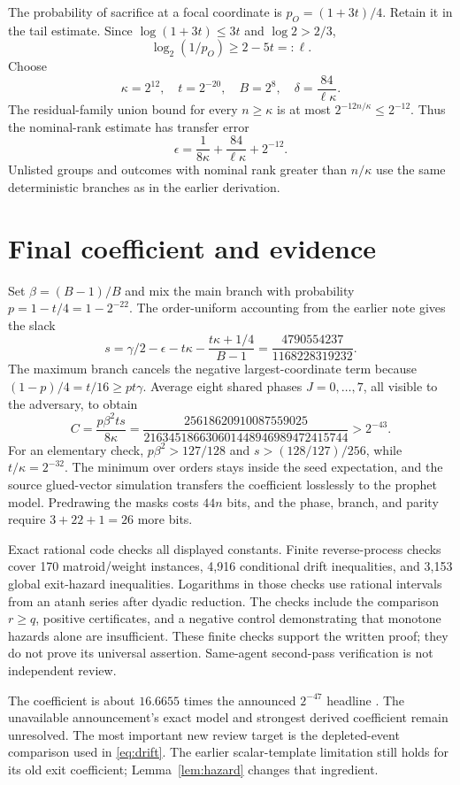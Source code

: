 \documentclass[11pt]{article}
\begin{document}
The probability of sacrifice at a focal coordinate is
$p_O=(1+3t)/4$. Retain it in the tail estimate. Since
$\log(1+3t)\le3t$ and $\log2>2/3$,
\[
 \log_2(1/p_O)\ge2-5t=:\ell.
\]
Choose
\[
 \kappa=2^{12},\quad t=2^{-20},\quad B=2^8,\quad
 \delta=\frac{84}{\ell\kappa}.
\]
The residual-family union bound for every $n\ge\kappa$ is at most
$2^{-12n/\kappa}\le2^{-12}$. Thus the nominal-rank estimate has
transfer error
\[
 \epsilon=\frac1{8\kappa}+\frac{84}{\ell\kappa}+2^{-12}.
\]
Unlisted groups and outcomes with nominal rank greater than $n/\kappa$
use the same deterministic branches as in the earlier derivation.

\section{Final coefficient and evidence}

Set $\beta=(B-1)/B$ and mix the main branch with probability
$p=1-t/4=1-2^{-22}$. The order-uniform accounting from the earlier note
gives the slack
\[
 s=\gamma/2-\epsilon-t\kappa-\frac{t\kappa+1/4}{B-1}
 =\frac{4790554237}{1168228319232}.
\]
The maximum branch cancels the negative largest-coordinate term because
$(1-p)/4=t/16\ge pt\gamma$. Average eight shared phases
$J=0,\ldots,7$, all visible to the adversary, to obtain
\[
 C=\frac{p\beta^2ts}{8\kappa}
 =\frac{25618620910087559025}{216345186630601448946989472415744}
 >2^{-43}.
\]
For an elementary check, $p\beta^2>127/128$ and
$s>(128/127)/256$, while $t/\kappa=2^{-32}$.
The minimum over orders stays inside the seed expectation, and the
source glued-vector simulation transfers the coefficient losslessly
to the prophet model. Predrawing the masks costs $44n$ bits, and the
phase, branch, and parity require $3+22+1=26$ more bits.

Exact rational code checks all displayed constants. Finite reverse-process
checks cover 170 matroid/weight instances, 4,916 conditional drift
inequalities, and 3,153 global exit-hazard inequalities. Logarithms in
those checks use rational intervals from an atanh series after dyadic
reduction. The checks include the comparison $r\ge q$, positive
certificates, and a negative control demonstrating that monotone hazards
alone are insufficient. These finite checks support the written proof;
they do not prove its universal assertion. Same-agent second-pass
verification is not independent review.

The coefficient is about $16.6655$ times the announced $2^{-47}$ headline
\cite{announcement}. The unavailable announcement's exact model and
strongest derived coefficient remain unresolved. The most important new
review target is the depleted-event comparison used in \eqref{eq:drift}.
The earlier scalar-template limitation still holds for its old exit
coefficient; Lemma~\ref{lem:hazard} changes that ingredient.
\end{document}
